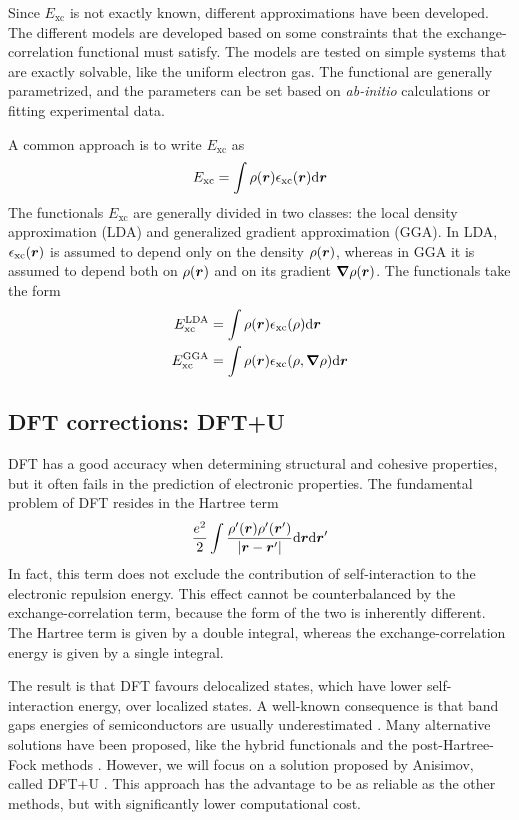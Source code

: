 Since $E_\text{xc}$ is not exactly known, different approximations have been developed. The different models are developed based on some constraints that the exchange-correlation functional must satisfy. The models are tested on simple systems that are exactly solvable, like the uniform electron gas. The functional are generally parametrized, and the parameters can be set based on \emph{ab-initio} calculations or fitting experimental data.

A common approach is to write $E_\text{xc}$ as
\begin{equation}
    E_\text{xc} = \int \rr{\rho} \rr{\epsilon_\text{xc}} \dr
\end{equation}
The functionals $E_\text{xc}$ are generally divided in two classes: the local density approximation (LDA) and generalized gradient approximation (GGA). In LDA, $\epsilon_\text{xc}(\mathbf{\boldsymbol{r}})$ is assumed to depend only on the density $\rho(\mathbf{\boldsymbol{r}})$, whereas in GGA it is assumed to depend both on $\rho(\mathbf{\boldsymbol{r}})$ and on its gradient $\grad \rho(\mathbf{\boldsymbol{r}})$. The functionals take the form
\begin{align}
    E_\text{xc}^\text{LDA} & = \int \rr{\rho} \epsilon_\text{xc}(\rho) \dr             \\
    E_\text{xc}^\text{GGA} & = \int \rr{\rho} \epsilon_\text{xc}(\rho, \grad \rho) \dr
\end{align}

\subsection{DFT corrections: DFT+U}
\label{sec:dft+u}
DFT has a good accuracy when determining structural and cohesive properties, but it often fails in the prediction of electronic properties. The fundamental problem of DFT resides in the Hartree term
\begin{equation}
    \frac{e^2}{2} \int \frac{\rho'(\vec{r})\rho'(\vec{r}')}{|\vec{r}-\vec{r}'|} \dr \dr'
\end{equation}
In fact, this term does not exclude the contribution of self-interaction to the electronic repulsion energy. This effect cannot be counterbalanced by the exchange-correlation term, because the form of the two is inherently different. The Hartree term is given by a double integral, whereas the exchange-correlation energy is given by a single integral.

The result is that DFT favours delocalized states, which have lower self-interaction energy, over localized states. A well-known consequence is that band gaps energies of semiconductors are usually underestimated \cite{seidl1996}. Many alternative solutions have been proposed, like the hybrid functionals and the post-Hartree-Fock methods \cite{tolba2018}. However, we will focus on a solution proposed by Anisimov, called DFT+U \cite{anisimov1991}. This approach has the advantage to be as reliable as the other methods, but with significantly lower computational cost.

